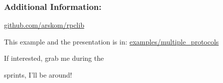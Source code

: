 \documentclass{beamer}
\begin{document}
\begin{frame}
  \frametitle{Additional Information:}

  \begin{center}
  \huge

  \href{http://github.com/arskom/rpclib}{github.com/arskom/rpclib}

  \bigskip

  \large

  This example and the presentation is in: \href{https://github.com/arskom/rpclib/tree/master/examples/multiple_protocols}{examples/multiple\_protocols}

  \bigskip

  \huge 
  
  If interested, grab me during the

  \bigskip

  sprints, I'll be around!
  
  \end{center}

\end{frame}
\end{document}
